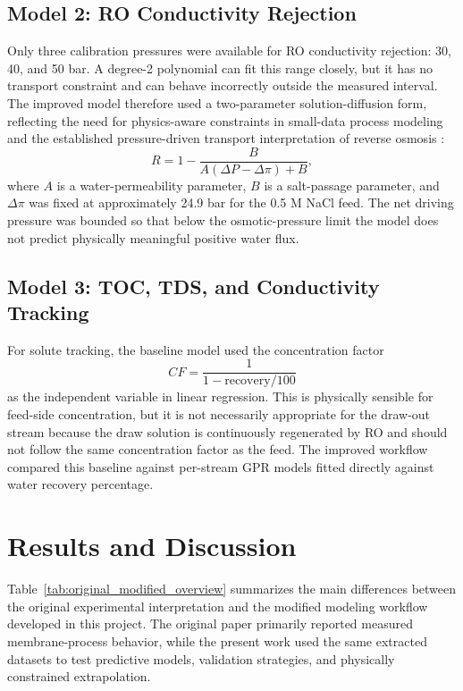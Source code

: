 \documentclass[journal, onecolumn, 12pt]{IEEEtran}
\begin{document}
\subsection{Model 2: RO Conductivity Rejection}
Only three calibration pressures were available for RO conductivity rejection: 30, 40, and 50 bar. A degree-2 polynomial can fit this range closely, but it has no transport constraint and can behave incorrectly outside the measured interval. The improved model therefore used a two-parameter solution-diffusion form, reflecting the need for physics-aware constraints in small-data process modeling \cite{b1} and the established pressure-driven transport interpretation of reverse osmosis \cite{b1,b6}:
\begin{equation}
R = 1 - \frac{B}{A(\Delta P-\Delta \pi)+B},
\end{equation}
where $A$ is a water-permeability parameter, $B$ is a salt-passage parameter, and $\Delta \pi$ was fixed at approximately 24.9 bar for the 0.5 M NaCl feed. The net driving pressure was bounded so that below the osmotic-pressure limit the model does not predict physically meaningful positive water flux.

\subsection{Model 3: TOC, TDS, and Conductivity Tracking}
For solute tracking, the baseline model used the concentration factor
\begin{equation}
CF=\frac{1}{1-\mathrm{recovery}/100}
\end{equation}
as the independent variable in linear regression. This is physically sensible for feed-side concentration, but it is not necessarily appropriate for the draw-out stream because the draw solution is continuously regenerated by RO and should not follow the same concentration factor as the feed. The improved workflow compared this baseline against per-stream GPR models fitted directly against water recovery percentage.

\section{Results and Discussion}
Table~\ref{tab:original_modified_overview} summarizes the main differences between the original experimental interpretation and the modified modeling workflow developed in this project. The original paper primarily reported measured membrane-process behavior, while the present work used the same extracted datasets to test predictive models, validation strategies, and physically constrained extrapolation.
\end{document}
